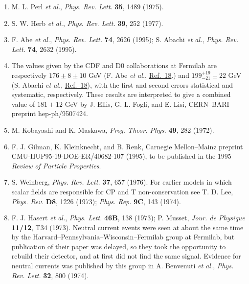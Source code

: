 \begin{enumerate}
\item {}\label{ch21-ref-16}
M. L. Perl \emph{et al.}, \emph{Phys. Rev. Lett.} \textbf{35}, 1489
(1975).

\item {}\label{ch21-ref-17}
S. W. Herb \emph{et al.}, \emph{Phys. Rev. Lett.} \textbf{39}, 252
(1977).

\item {}\label{ch21-ref-18}
F. Abe \emph{et al.}, \emph{Phys. Rev. Lett.} \textbf{74}, 2626 (1995);
S. Abachi \emph{et al.}, \emph{Phys. Rev. Lett.} \textbf{74}, 2632
(1995).

\item {}\label{ch21-ref-19}
The values given by the CDF and D0 collaborations at Fermilab are
respectively $176\pm8\pm10$ GeV (F. Abe \emph{et al.},
\hyperref[ch21-ref-18]{Ref.~18}.) and
$199^{+19}_{-21}\pm22$ GeV (S. Abachi \emph{et al.},
\hyperref[ch21-ref-18]{Ref.~18}), with the first and second errors
statistical and systematic, respectively. These results are interpreted to
give a combined value of $181\pm12$ GeV by J. Ellis, G. L. Fogli, and
E. Lisi, CERN--BARI preprint hep-ph/9507424.

\item {}\label{ch21-ref-20}
M. Kobayashi and K. Maskawa, \emph{Prog. Theor. Phys.} \textbf{49}, 282
(1972).

\item[20a.] \label{ch21-ref-20a}
F. J. Gilman, K. Kleinknecht, and B. Renk, Carnegie Mellon--Mainz
preprint CMU-HUP95-19-DOE-ER/40682-107 (1995), to be published in the
1995 \emph{Review of Particle Properties}.

\item[20b.] \label{ch21-ref-20b}
S. Weinberg, \emph{Phys. Rev. Lett.} \textbf{37}, 657 (1976). For earlier
models in which scalar fields are responsible for CP and T
non-conservation see T. D. Lee, \emph{Phys. Rev.} \textbf{D8}, 1226
(1973); \emph{Phys. Rep.} \textbf{9C}, 143 (1974).

\item {}\label{ch21-ref-21}
F. J. Hasert \emph{et al.}, \emph{Phys. Lett.} \textbf{46B}, 138 (1973);
P. Musset, \emph{Jour. de Physique} \textbf{11/12}, T34 (1973). Neutral
current events were seen at about the same time by the
Harvard--Pennsylvania--Wisconsin--Fermilab group at Fermilab, but
publication of their paper was delayed, so they took the opportunity to
rebuild their detector, and at first did not find the same signal. Evidence
for neutral currents was published by this group in A. Benvenuti
\emph{et al.}, \emph{Phys. Rev. Lett.} \textbf{32}, 800 (1974).


\end{enumerate}
